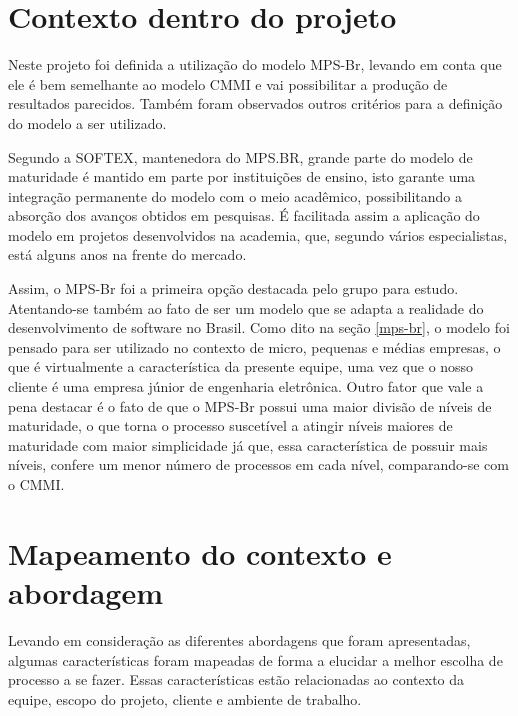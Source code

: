   \section{Contexto dentro do projeto}
Neste projeto foi definida a utilização do modelo MPS-Br, levando em conta que ele é bem semelhante ao modelo CMMI e vai possibilitar a produção de resultados parecidos. Também foram observados outros critérios para a definição do modelo a ser utilizado.

Segundo a SOFTEX, mantenedora do MPS.BR, grande parte do modelo de maturidade é mantido em parte por instituições de ensino, isto garante uma integração permanente do modelo com o meio acadêmico, possibilitando a absorção dos avanços obtidos em pesquisas. É facilitada assim a aplicação do modelo em projetos desenvolvidos na academia, que, segundo vários especialistas, está alguns anos na frente do mercado. 

Assim, o MPS-Br foi a primeira opção destacada pelo grupo para estudo. Atentando-se também ao fato de ser um modelo que se adapta a realidade do desenvolvimento de software no Brasil. Como dito na seção \ref{mps-br}, o modelo foi pensado para ser utilizado no contexto de micro, pequenas e médias empresas, o que é virtualmente a característica da presente equipe, uma vez que o nosso cliente é uma empresa júnior de engenharia eletrônica. Outro fator que vale a pena destacar é o fato de que o MPS-Br possui uma maior divisão de níveis de maturidade, o que torna o processo suscetível a atingir níveis maiores de maturidade com maior simplicidade já que, essa característica de possuir mais níveis, confere um menor número de processos em cada nível, comparando-se com o CMMI.
  
  \section{Mapeamento do contexto e abordagem}
Levando em consideração as diferentes abordagens que foram apresentadas, algumas características foram mapeadas de forma a elucidar a melhor escolha de processo a se fazer. Essas características estão relacionadas ao contexto da equipe, escopo do projeto, cliente e ambiente de trabalho.

